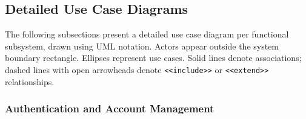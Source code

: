 
\subsection{Detailed Use Case Diagrams}

The following subsections present a detailed use case diagram per functional subsystem, drawn using UML notation. Actors appear outside the system boundary rectangle. Ellipses represent use cases. Solid lines denote associations; dashed lines with open arrowheads denote \texttt{<<include>>} or \texttt{<<extend>>} relationships.

\subsubsection{Authentication and Account Management}


